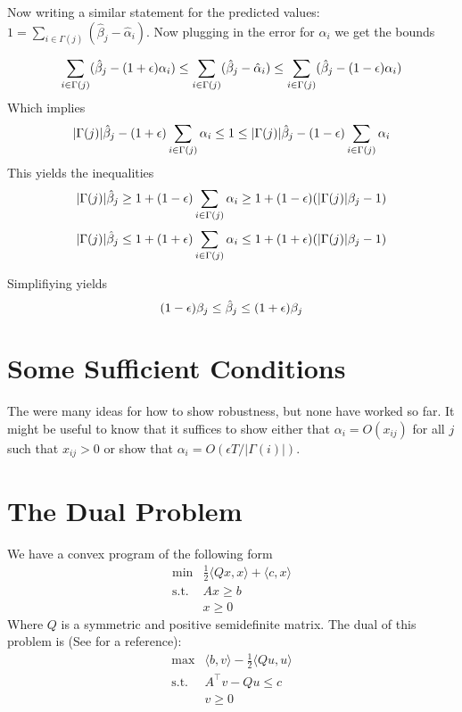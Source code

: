 \documentclass[11pt]{article}
\newcommand{\eps}{\ensuremath \epsilon}
\begin{document}
Now writing a similar statement for the predicted values: $1 = \sum_{i \in \Gamma(j)} (\hat{\beta}_j - \hat{\alpha}_i)$.  Now plugging in the error for $\hat{\alpha}_i$ we get the bounds

\[
 \sum_{i \in \Gamma(j)} (\hat{\beta}_j - (1+\eps)\alpha_i)  \leq
 \sum_{i \in \Gamma(j)} (\hat{\beta}_j - \hat{\alpha}_i) 
 \leq \sum_{i \in \Gamma(j)} (\hat{\beta}_j -(1-\eps) \alpha_i)
\]
Which implies
\[
 |\Gamma(j)| \hat{\beta}_j-(1+\eps)\sum_{i \in \Gamma(j)} \alpha_i  \leq
1
 \leq |\Gamma(j)|\hat{\beta}_j -(1-\eps) \sum_{i \in \Gamma(j)} \alpha_i
\]
This yields the inequalities
\[
|\Gamma(j) |\hat{\beta}_j \geq 1 + (1-\eps) \sum_{i \in \Gamma(j)} \alpha_i \geq 1 + (1-\eps) ( |\Gamma(j)| \beta_j -1 ) 
\]
\[
|\Gamma(j) |\hat{\beta}_j \leq 1 + (1+\eps) \sum_{i \in \Gamma(j)} \alpha_i \leq 1 + (1+\eps) ( |\Gamma(j)| \beta_j -1 )
\]

Simplifiying yields
\[
 (1-\eps) \beta_j \leq \hat{\beta}_j \leq (1+\eps) \beta_j
\]

\section{Some Sufficient Conditions}

The were many ideas for how to show robustness, but none have worked so far.  It might be useful to know that it suffices to show either that $\alpha_{i} = O(x_{ij})$ for all $j$ such that $x_{ij} > 0$ or show that $\alpha_{i} = O(\epsilon T / |\Gamma(i)|)$.


\section{The Dual Problem}

We have a convex program of the following form
\[
\begin{array}{cc}
\min & \frac{1}{2}\langle Qx, x \rangle + \langle c , x \rangle \\
\text{s.t.} & A x \geq b \\
 & x \geq 0 
\end{array}
\]
Where $Q$ is a symmetric and positive semidefinite matrix.  The dual of this problem is (See \cite{QPDual} for a reference):
\[ \begin{array}{cc}
\max & \langle b, v \rangle - \frac{1}{2} \langle Qu, u \rangle \\
\text{s.t.} & A^{\top} v - Q u \leq c \\
 & v \geq 0
\end{array} \]
\end{document}

